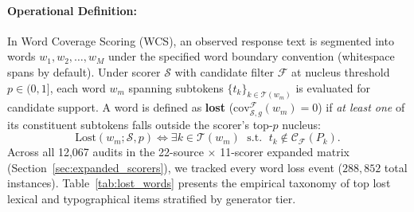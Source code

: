 \documentclass[11pt,a4paper,twocolumn]{article}
\begin{document}
\paragraph{Operational Definition:}
In Word Coverage Scoring (WCS), an observed response text is segmented into words $w_1, w_2, \dots, w_M$ under the specified word boundary convention (whitespace spans by default). Under scorer $\mathcal{S}$ with candidate filter $\mathcal{F}$ at nucleus threshold $p \in (0, 1]$, each word $w_m$ spanning subtokens $\{t_k\}_{k \in \mathcal{T}(w_m)}$ is evaluated for candidate support. A word is defined as \textbf{lost} ($\text{cov}_{\mathcal{S},g}^{\mathcal{F}}(w_m) = 0$) if \emph{at least one} of its constituent subtokens falls outside the scorer's top-$p$ nucleus:
\begin{equation}
    \text{Lost}(w_m; \mathcal{S}, p) \iff \exists k \in \mathcal{T}(w_m) \;\text{ s.t. }\; t_k \notin \mathcal{C}_{\mathcal{F}}(P_k).
\end{equation}
Across all 12,067 audits in the 22-source $\times$ 11-scorer expanded matrix (Section~\ref{sec:expanded_scorers}), we tracked every word loss event ($288{,}852$ total instances). Table~\ref{tab:lost_words} presents the empirical taxonomy of top lost lexical and typographical items stratified by generator tier.
\end{document}
